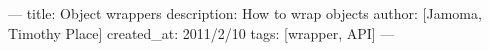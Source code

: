 --- 
title: Object wrappers
description: How to wrap objects
author: [Jamoma, Timothy Place]
created_at: 2011/2/10
tags: [wrapper, API]
---
